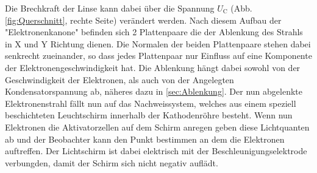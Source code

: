 Die Brechkraft der Linse kann dabei über die Spannung $U_{\text{C}}$ (Abb. \ref{fig:Querschnitt}, rechte Seite) verändert werden.
Nach diesem Aufbau der "Elektronenkanone" befinden sich 2 Plattenpaare die der Ablenkung des Strahls in X und Y Richtung dienen.
Die Normalen der beiden Plattenpaare stehen dabei senkrecht zueinander, so dass jedes Plattenpaar nur Einfluss auf eine Komponente der Elektronengeschwindigkeit hat.
Die Ablenkung hängt dabei sowohl von der Geschwindigkeit der Elektronen, als auch von der Angelegten Kondensatorspannung ab, näheres dazu in \ref{sec:Ablenkung}.
Der nun abgelenkte Elektronenstrahl fällt nun auf das Nachweissystem, welches aus einem speziell beschichteten Leuchtschirm innerhalb der Kathodenröhre besteht.
Wenn nun Elektronen die Aktivatorzellen auf dem Schirm anregen geben diese Lichtquanten ab und der Beobachter kann den Punkt bestimmen an dem die Elektronen auftreffen.
Der Lichtschirm ist dabei elektrisch mit der Beschleunigungselektrode verbungden, damit der Schirm sich nicht negativ auflädt.
